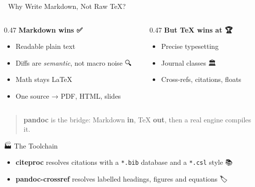 \documentclass[
  10pt,
  ignorenonframetext,
  serif,
  aspectratio=169]{beamer}
\providecommand{\tightlist}{%
  \setlength{\itemsep}{0pt}\setlength{\parskip}{0pt}}
\begin{document}
\begin{frame}{🤔 Why Write Markdown, Not Raw TeX?}
\protect{}\label{why-write-markdown-not-raw-tex}
\begin{columns}[T]
\begin{column}{0.47\linewidth}
\textbf{Markdown wins ✅}

\begin{itemize}
\tightlist
\item
  Readable plain text 📖
\item
  Diffs are \emph{semantic}, not macro noise 🔍
\item
  Math stays LaTeX 📐
\item
  One source → PDF, HTML, slides 🎯
\end{itemize}
\end{column}

\begin{column}{0.47\linewidth}
\textbf{But TeX wins at 🏆}

\begin{itemize}
\tightlist
\item
  Precise typesetting 📕
\item
  Journal classes 🏛️
\item
  Cross-refs, citations, floats 🔢
\end{itemize}
\end{column}
\end{columns}

\begin{quote}
\textbf{pandoc} is the bridge: Markdown \textbf{in}, TeX \textbf{out},
then a real engine compiles it. 🌉
\end{quote}
\end{frame}

\begin{frame}[fragile]{🏭 The Toolchain}
\protect{}\label{the-toolchain}
\begin{center}
\end{center}

\begin{itemize}
\tightlist
\item
  \textbf{citeproc} resolves citations with a \texttt{*.bib} database
  and a \texttt{*.csl} style 📚
\item
  \textbf{pandoc-crossref} resolves labelled headings, figures and
  equations 🏷️
\end{itemize}
\end{frame}
\end{document}
